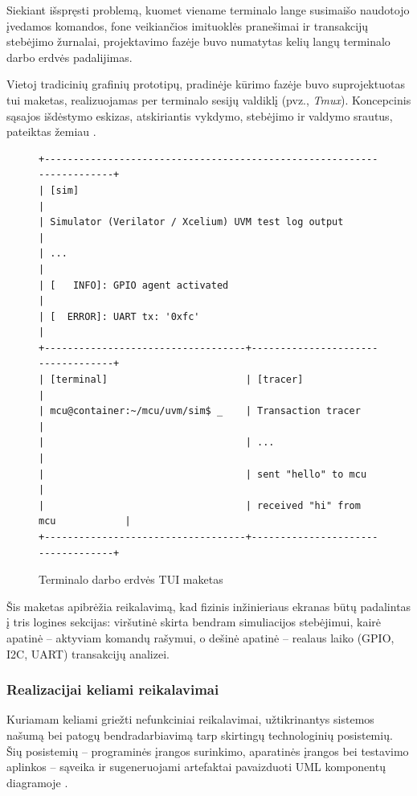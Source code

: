 Siekiant išspręsti problemą, kuomet viename terminalo lange susimaišo naudotojo įvedamos komandos, fone veikiančios imituoklės pranešimai ir transakcijų stebėjimo žurnalai, projektavimo fazėje buvo numatytas kelių langų terminalo darbo erdvės padalijimas. 

Vietoj tradicinių grafinių prototipų, pradinėje kūrimo fazėje buvo suprojektuotas \gls{tui} maketas, realizuojamas per terminalo sesijų valdiklį (pvz., \textit{Tmux}). Koncepcinis sąsajos išdėstymo eskizas, atskiriantis vykdymo, stebėjimo ir valdymo srautus, pateiktas žemiau \pav{\ref{fig:tui_mockup}}.

\begin{figure}[H]
	\begin{verbatim}
+-----------------------------------------------------------------------+
| [sim]                                                                 |
| Simulator (Verilator / Xcelium) UVM test log output                   |
| ...                                                                   |
| [   INFO]: GPIO agent activated                                       |
| [  ERROR]: UART tx: '0xfc'                                            |
+-----------------------------------+-----------------------------------+
| [terminal]                        | [tracer]                          |
| mcu@container:~/mcu/uvm/sim$ _    | Transaction tracer                |
|                                   | ...                               |
|                                   | sent "hello" to mcu               |
|                                   | received "hi" from mcu            |
+-----------------------------------+-----------------------------------+
	\end{verbatim}
	\caption{Terminalo darbo erdvės TUI maketas}
	\label{fig:tui_mockup}
\end{figure}

Šis maketas apibrėžia reikalavimą, kad fizinis inžinieriaus ekranas būtų padalintas į tris logines sekcijas: viršutinė skirta bendram simuliacijos stebėjimui, kairė apatinė -- aktyviam komandų rašymui, o dešinė apatinė -- realaus laiko (GPIO, I2C, UART) transakcijų analizei.

\subsubsection{Realizacijai keliami reikalavimai}

Kuriamam    keliami griežti nefunkciniai reikalavimai, užtikrinantys sistemos našumą bei patogų bendradarbiavimą tarp skirtingų technologinių posistemių. Šių posistemių -- programinės įrangos surinkimo, aparatinės įrangos  bei testavimo aplinkos -- sąveika ir sugeneruojami artefaktai pavaizduoti UML komponentų diagramoje \pav{\ref{fig:uml_realization_architecture}}.

